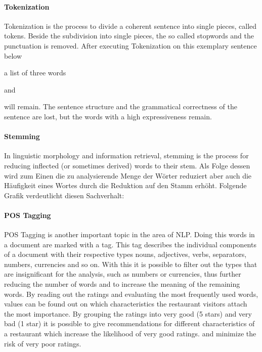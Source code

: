 \paragraph{Tokenization}
Tokenization is the process to divide a coherent sentence into single pieces, called tokens.
Beside the subdivision into single pieces, the so called stopwords and the punctuation is removed.
After executing Tokenization on this exemplary sentence below
\begin{center}
\end{center}
a list of three words
\begin{center}
    and 
\end{center}
will remain.\newline
The sentence structure and the grammatical correctness of the sentence are lost, but the words with a high expressiveness remain.
\paragraph{Stemming}
In linguistic morphology and information retrieval, stemming is the process for reducing inflected (or sometimes derived) words to their stem.\cite{TextMiner14}
Als Folge dessen wird zum Einen die zu analysierende Menge der Wörter reduziert aber
auch die Häufigkeit eines Wortes durch die Reduktion auf den Stamm erhöht.
Folgende Grafik verdeutlicht diesen Sachverhalt:
\paragraph{\acs{POS} Tagging}
\ac{POS} Tagging is another important topic in the area of \ac{NLP}.
Doing this words in a document are marked with a tag.
This tag describes the individual components of a document with their respective types \eg{} nouns, adjectives, verbs, separators, numbers, currencies and so on.
With this it is possible to filter out the types that are insignificant for the analysis, such as numbers or currencies, thus further reducing the number of words and
to increase the meaning of the remaining words.
\newline
By reading out the ratings and evaluating the most frequently used words, values can be found out on which characteristics the restaurant visitors attach the most importance.
By grouping the ratings into very good (5 stars) and very bad (1 star) it is possible to give recommendations for different characteristics of a restaurant which increase the likelihood of very good ratings.
and minimize the risk of very poor ratings.
